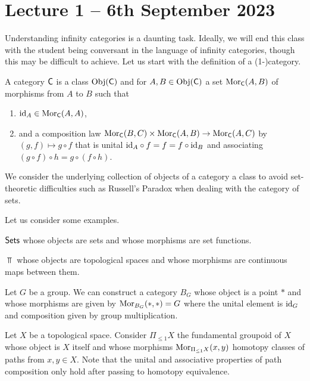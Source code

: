 \section{Lecture 1 -- 6th September 2023}
Understanding infinity categories is a daunting task. Ideally, we will end this class with the student being conversant in the language of infinity categories, though this may be difficult to achieve. Let us start with the definition of a (1-)category. 
\begin{definition}[Category]
    A category $\mathsf{C}$ is a class $\mathrm{Obj}(\mathsf{C})$ and for $A,B\in\mathrm{Obj}(\mathsf{C})$ a set $\mathrm{Mor}_{\mathsf{C}}(A,B)$ of morphisms from $A$ to $B$ such that
    \begin{enumerate}[label=(\alph*)]
        \item $\mathrm{id}_{A}\in\mathrm{Mor}_{\mathsf{C}}(A,A)$,
        \item and a composition law $\mathrm{Mor}_{\mathsf{C}}(B,C)\times\mathrm{Mor}_{\mathsf{C}}(A,B)\to\mathrm{Mor}_{\mathsf{C}}(A,C)$ by $(g,f)\mapsto g\circ f$ that is unital $\mathrm{id}_{A}\circ f=f=f\circ\mathrm{id}_{B}$ and associating $(g\circ f)\circ h=g\circ(f\circ h)$. 
    \end{enumerate}
\end{definition}
\begin{remark}
  We consider the underlying collection of objects of a category a class to avoid set-theoretic difficulties such as Russell's Paradox when dealing with the category of sets. 
\end{remark}
Let us consider some examples. 
\begin{example}
  $\mathsf{Sets}$ whose objects are sets and whose morphisms are set functions. 
\end{example}
\begin{example}
  $\Top$ whose objects are topological spaces and whose morphisms are continuous maps between them. 
\end{example}
\begin{example}\label{ex:representable spaces}
Let $G$ be a group. We can construct a category $B_{G}$ whose object is a point $*$ and whose morphisms are given by $\mathrm{Mor}_{B_{G}}(*,*)=G$ where the unital element is $\mathrm{id}_{G}$ and composition given by group multiplication.
\end{example}
\begin{example}\label{ex: fundamental groupoid}
Let $X$ be a topological space. Consider $\Pi_{\leq1}X$ the fundamental groupoid of $X$ whose object is $X$ itself and whose morphisms $\mathrm{Mor}_{\Pi_{\leq1}X}(x,y)$ homotopy classes of paths from $x,y\in X$. Note that the unital and associative properties of path composition only hold after passing to homotopy equivalence. 
\end{example}
